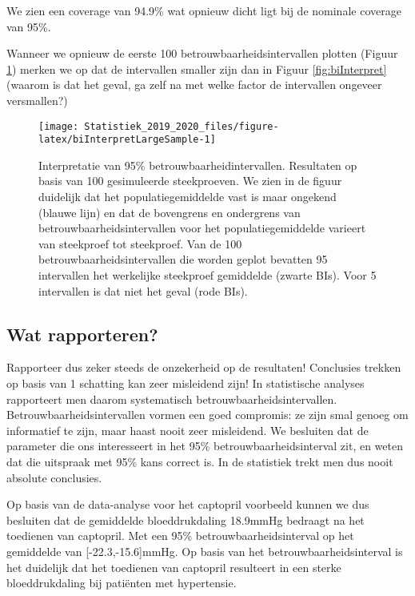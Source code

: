 \documentclass[12pt,dutch,coursenotes]{book}
\theoremstyle{definition}
\theoremstyle{definition}
\theoremstyle{definition}
\theoremstyle{remark}
\begin{document}
We zien een coverage van 94.9\% wat opnieuw dicht ligt bij de nominale
coverage van 95\%.

Wanneer we opnieuw de eerste 100 betrouwbaarheidsintervallen plotten
(Figuur \ref{fig:biInterpretLargeSample}) merken we op dat de
intervallen smaller zijn dan in Figuur \ref{fig:biInterpret} (waarom is
dat het geval, ga zelf na met welke factor de intervallen ongeveer
versmallen?)

\begin{figure}

{\centering \texttt{[image: Statistiek\_2019\_2020\_files/figure-latex/biInterpretLargeSample-1]} 

}

\caption{Interpretatie van 95$\%$ betrouwbaarheidintervallen. Resultaten op basis van 100 gesimuleerde steekproeven. We zien in de figuur duidelijk dat het populatiegemiddelde vast is maar ongekend (blauwe lijn) en dat de bovengrens en ondergrens van betrouwbaarheidsintervallen voor het populatiegemiddelde varieert van steekproef tot steekproef. Van de 100 betrouwbaarheidsintervallen die worden geplot bevatten 95 intervallen het werkelijke steekproef gemiddelde (zwarte BIs). Voor 5 intervallen is dat niet het geval (rode BIs).}\label{fig:biInterpretLargeSample}
\end{figure}

\subsection{Wat rapporteren?}\label{wat-rapporteren}

Rapporteer dus zeker steeds de onzekerheid op de resultaten! Conclusies
trekken op basis van 1 schatting kan zeer misleidend zijn! In
statistische analyses rapporteert men daarom systematisch
betrouwbaarheidsintervallen. Betrouwbaarheidsintervallen vormen een goed
compromis: ze zijn smal genoeg om informatief te zijn, maar haast nooit
zeer misleidend. We besluiten dat de parameter die ons interesseert in
het 95\% betrouwbaarheidsinterval zit, en weten dat die uitspraak met
95\% kans correct is. In de statistiek trekt men dus nooit absolute
conclusies.

Op basis van de data-analyse voor het captopril voorbeeld kunnen we dus
besluiten dat de gemiddelde bloeddrukdaling 18.9mmHg bedraagt na het
toedienen van captopril. Met een 95\% betrouwbaarheidsinterval op het
gemiddelde van {[}-22.3,-15.6{]}mmHg. Op basis van het
betrouwbaarheidsinterval is het duidelijk dat het toedienen van
captopril resulteert in een sterke bloeddrukdaling bij patiënten met
hypertensie.
\end{document}
